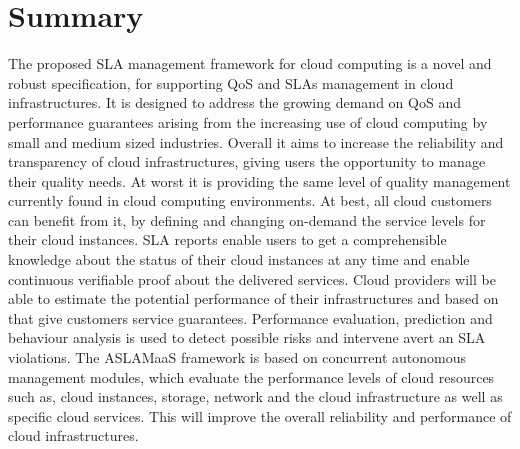 \section{Summary}
The proposed SLA management framework for cloud computing is a novel and robust specification, for supporting QoS and SLAs management in cloud infrastructures. It is designed to address the growing demand on QoS and performance guarantees arising from the increasing use of cloud computing by small and medium sized industries. Overall it aims to increase the reliability and transparency of cloud infrastructures, giving users the opportunity to manage their quality needs. At worst it is providing the same level of quality management currently found in cloud computing environments. At best, all cloud customers can benefit from it, by defining and changing on-demand the service levels for their cloud instances. SLA reports enable users to get a comprehensible knowledge about the status of their cloud instances at any time and enable continuous verifiable proof about the delivered services. Cloud providers will be able to estimate the potential performance of their infrastructures and based on that give customers service guarantees. Performance evaluation, prediction and behaviour analysis is used to detect possible risks and intervene avert an SLA violations. The ASLAMaaS framework is based on concurrent autonomous management modules, which  evaluate the performance levels of cloud resources such as, cloud instances, storage, network and the cloud infrastructure as well as specific cloud services. This will improve the overall reliability and performance of cloud infrastructures.